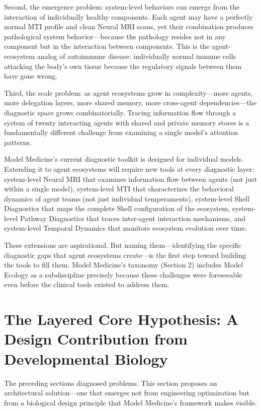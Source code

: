 \documentclass[11pt]{article}
\begin{document}
Second, the emergence problem: system-level behaviors can emerge from the interaction of individually healthy components. Each agent may have a perfectly normal MTI profile and clean Neural MRI scans, yet their combination produces pathological system behavior---because the pathology resides not in any component but in the interaction between components. This is the agent-ecosystem analog of autoimmune disease: individually normal immune cells attacking the body's own tissue because the regulatory signals between them have gone wrong.

Third, the scale problem: as agent ecosystems grow in complexity---more agents, more delegation layers, more shared memory, more cross-agent dependencies---the diagnostic space grows combinatorially. Tracing information flow through a system of twenty interacting agents with shared and private memory stores is a fundamentally different challenge from examining a single model's attention patterns.

Model Medicine's current diagnostic toolkit is designed for individual models. Extending it to agent ecosystems will require new tools at every diagnostic layer: system-level Neural MRI that examines information flow between agents (not just within a single model), system-level MTI that characterizes the behavioral dynamics of agent teams (not just individual temperaments), system-level Shell Diagnostics that maps the complete Shell configuration of the ecosystem, system-level Pathway Diagnostics that traces inter-agent interaction mechanisms, and system-level Temporal Dynamics that monitors ecosystem evolution over time.

These extensions are aspirational. But naming them---identifying the specific diagnostic gaps that agent ecosystems create---is the first step toward building the tools to fill them. Model Medicine's taxonomy (Section 2) includes Model Ecology as a subdiscipline precisely because these challenges were foreseeable even before the clinical tools existed to address them.


\section{The Layered Core Hypothesis: A Design Contribution from Developmental Biology}

The preceding sections diagnosed problems. This section proposes an architectural solution---one that emerges not from engineering optimization but from a biological design principle that Model Medicine's framework makes visible.
\end{document}
